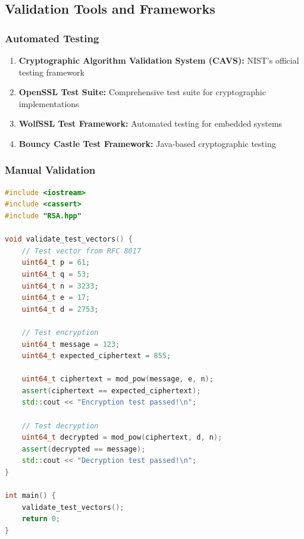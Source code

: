 \documentclass[11pt,a4paper]{article}
\begin{document}
\subsection{Validation Tools and Frameworks}

\subsubsection{Automated Testing}

\begin{enumerate}
    \item \textbf{Cryptographic Algorithm Validation System (CAVS):} NIST's official testing framework
    
    \item \textbf{OpenSSL Test Suite:} Comprehensive test suite for cryptographic implementations
    
    \item \textbf{WolfSSL Test Framework:} Automated testing for embedded systems
    
    \item \textbf{Bouncy Castle Test Framework:} Java-based cryptographic testing
\end{enumerate}

\subsubsection{Manual Validation}

\begin{lstlisting}[language=C++, caption=Manual Test Vector Validation]
#include <iostream>
#include <cassert>
#include "RSA.hpp"

void validate_test_vectors() {
    // Test vector from RFC 8017
    uint64_t p = 61;
    uint64_t q = 53;
    uint64_t n = 3233;
    uint64_t e = 17;
    uint64_t d = 2753;
    
    // Test encryption
    uint64_t message = 123;
    uint64_t expected_ciphertext = 855;
    
    uint64_t ciphertext = mod_pow(message, e, n);
    assert(ciphertext == expected_ciphertext);
    std::cout << "Encryption test passed!\n";
    
    // Test decryption
    uint64_t decrypted = mod_pow(ciphertext, d, n);
    assert(decrypted == message);
    std::cout << "Decryption test passed!\n";
}

int main() {
    validate_test_vectors();
    return 0;
}
\end{lstlisting}
\end{document}
